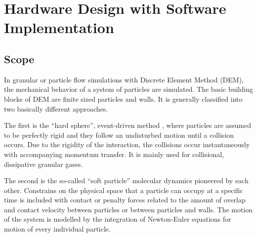 \chapter{Hardware Design with Software Implementation}
\label{chp:hwsw}


\section{Scope}

In granular or particle flow simulations with Discrete Element Method (DEM),
the mechanical behavior of a system of particles are simulated. The basic
building blocks of DEM are finite sized particles and walls. It is generally
classified into two basically different approaches.

The first is the ``hard sphere'', event-driven method
\citep[e.g.][]{Luding-1994, Luding-2004}, where particles are assumed to be
perfectly rigid and they follow an undisturbed motion until a collision
occurs. Due to the rigidity of the interaction, the collisions occur
instantaneously with accompanying momentum transfer. It is mainly used for
collisional, dissipative granular gases.

The second is the so-called ``soft particle'' molecular dynamics pioneered by
each other. Constrains on the physical space that a particle can occupy at a
specific time is included with contact or penalty forces related to the
amount of overlap and contact velocity between particles or between particles
and walls. The motion of the system is modelled by the integration of
Newton-Euler equations for motion of every individual particle.
